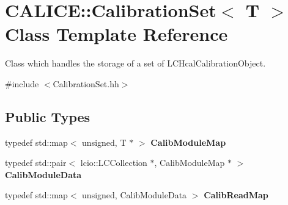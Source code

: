\section{CALICE::CalibrationSet$<$ T $>$ Class Template Reference}
\label{classCALICE_1_1CalibrationSet}


Class which handles the storage of a set of LCHcalCalibrationObject.  


{\ttfamily \#include $<$CalibrationSet.hh$>$}\subsection*{Public Types}
\begin{DoxyCompactItemize}
\item 
typedef std::map$<$ unsigned, T $\ast$ $>$ {\bfseries CalibModuleMap}\label{classCALICE_1_1CalibrationSet_ae0ef8d231d149d1e61a4000952d58d67}

\item 
typedef std::pair$<$ lcio::LCCollection $\ast$, CalibModuleMap $\ast$ $>$ {\bfseries CalibModuleData}\label{classCALICE_1_1CalibrationSet_a894d8c42a35b66022bb221db4585f5f5}

\item 
typedef std::map$<$ unsigned, CalibModuleData $>$ {\bfseries CalibReadMap}\label{classCALICE_1_1CalibrationSet_a6f4a5967aa3a3ad50d763a92809fcf60}

\end{DoxyCompactItemize}
